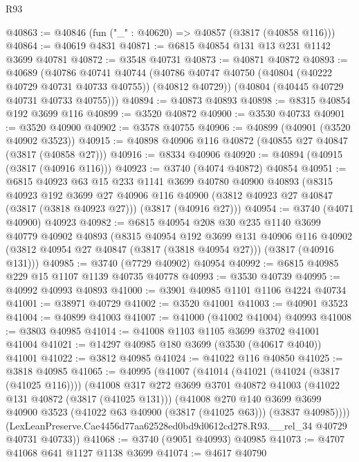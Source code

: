 \begin{lexlean}{R93}
\begin{coremodule}
@40863 := @40846 (fun ("_" : @40620) => @40857 (@3817 (@40858 @116)))
@40864 := @40619 @4831
@40871 := @6815 @40854 @131 @13 @231 @1142 @3699 @40781
@40872 := @3548 @40731
@40873 := @40871 @40872
@40893 := @40689
    (@40786
      @40741
      @40744
      (@40786 @40747 @40750 (@40804 (@40222 @40729 @40731 @40733 @40755)) (@40812 @40729))
      (@40804 (@40445 @40729 @40731 @40733 @40755)))
@40894 := @40873 @40893
@40898 := @8315 @40854 @192 @3699 @116
@40899 := @3520 @40872
@40900 := @3530 @40733
@40901 := @3520 @40900
@40902 := @3578 @40755
@40906 := @40899 (@40901 (@3520 @40902 @3523))
@40915 := @40898 @40906 @116 @40872 (@40855 @27 @40847 (@3817 (@40858 @27)))
@40916 := @8334 @40906
@40920 := @40894 (@40915 (@3817 (@40916 @116)))
@40923 := @3740 (@4074 @40872) @40854
@40951 := @6815
    @40923
    @63
    @15
    @233
    @1141
    @3699
    @40780
    @40900
    @40893
    (@8315
      @40923
      @192
      @3699
      @27
      @40906
      @116
      @40900
      (@3812 @40923 @27 @40847 (@3817 (@3818 @40923 @27)))
      (@3817 (@40916 @27)))
@40954 := @3740 (@4071 @40900) @40923
@40982 := @6815
    @40954
    @208
    @30
    @235
    @1140
    @3699
    @40779
    @40902
    @40893
    (@8315
      @40954
      @192
      @3699
      @131
      @40906
      @116
      @40902
      (@3812 @40954 @27 @40847 (@3817 (@3818 @40954 @27)))
      (@3817 (@40916 @131)))
@40985 := @3740 (@7729 @40902) @40954
@40992 := @6815 @40985 @229 @15 @1107 @1139 @40735 @40778
@40993 := @3530 @40739
@40995 := @40992 @40993 @40893
@41000 := @3901 @40985 @1101 @1106 @4224 @40734
@41001 := @38971 @40729
@41002 := @3520 @41001
@41003 := @40901 @3523
@41004 := @40899 @41003
@41007 := @41000 (@41002 @41004) @40993
@41008 := @3803 @40985
@41014 := @41008 @1103 @1105 @3699 @3702 @41001 @41004
@41021 := @14297 @40985 @180 @3699 (@3530 (@40617 @4040)) @41001
@41022 := @3812 @40985
@41024 := @41022 @116 @40850
@41025 := @3818 @40985
@41065 := @40995
    (@41007
      (@41014
        (@41021 (@41024 (@3817 (@41025 @116))))
        (@41008
          @317
          @272
          @3699
          @3701
          @40872
          @41003
          (@41022 @131 @40872 (@3817 (@41025 @131)))
          (@41008
            @270
            @140
            @3699
            @3699
            @40900
            @3523
            (@41022 @63 @40900 (@3817 (@41025 @63)))
            (@3837 @40985))))
      (LexLeanPreserve.Cae4456d77aa62528ed0bd9d0612cd278.R93.__rel_34 @40729 @40731 @40733))
@41068 := @3740 (@9051 @40993) @40985
@41073 := @4707 @41068 @641 @1127 @1138 @3699
@41074 := @4617 @40790

\end{coremodule}
\end{lexlean}
